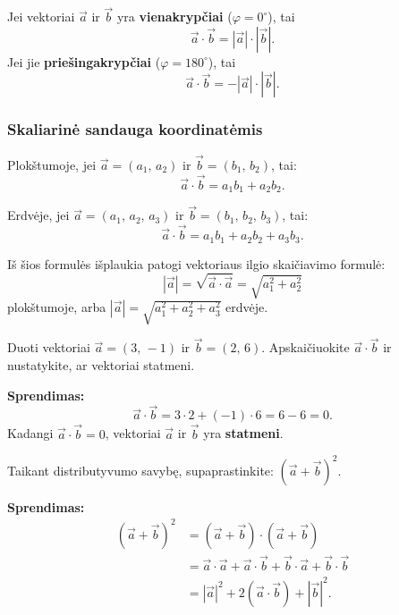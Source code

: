\begin{corollary}[Kolinearumas]
Jei vektoriai $\vec{a}$ ir $\vec{b}$ yra \textbf{vienakrypčiai} ($\varphi = 0^\circ$), tai
\[
\vec{a} \cdot \vec{b} = |\vec{a}| \cdot |\vec{b}|.
\]
Jei jie \textbf{priešingakrypčiai} ($\varphi = 180^\circ$), tai
\[
\vec{a} \cdot \vec{b} = -|\vec{a}| \cdot |\vec{b}|.
\]
\end{corollary}

\subsubsection*{Skaliarinė sandauga koordinatėmis}

Plokštumoje, jei $\vec{a} = (a_1,\, a_2)$ ir $\vec{b} = (b_1,\, b_2)$, tai:
\[
\vec{a} \cdot \vec{b} = a_1 b_1 + a_2 b_2.
\]

Erdvėje, jei $\vec{a} = (a_1,\, a_2,\, a_3)$ ir $\vec{b} = (b_1,\, b_2,\, b_3)$, tai:
\[
\vec{a} \cdot \vec{b} = a_1 b_1 + a_2 b_2 + a_3 b_3.
\]

\begin{remark}
Iš šios formulės išplaukia patogi vektoriaus ilgio skaičiavimo formulė:
\[
|\vec{a}| = \sqrt{\vec{a} \cdot \vec{a}} = \sqrt{a_1^2 + a_2^2}
\]
plokštumoje, arba $|\vec{a}| = \sqrt{a_1^2 + a_2^2 + a_3^2}$ erdvėje.
\end{remark}

\begin{example}
Duoti vektoriai $\vec{a} = (3,\, -1)$ ir $\vec{b} = (2,\, 6)$. Apskaičiuokite $\vec{a} \cdot \vec{b}$ ir nustatykite, ar vektoriai statmeni.

\textbf{Sprendimas:}
\[
\vec{a} \cdot \vec{b} = 3 \cdot 2 + (-1) \cdot 6 = 6 - 6 = 0.
\]
Kadangi $\vec{a} \cdot \vec{b} = 0$, vektoriai $\vec{a}$ ir $\vec{b}$ yra \textbf{statmeni}.
\end{example}

\begin{example}
Taikant distributyvumo savybę, supaprastinkite: $(\vec{a} + \vec{b})^2$.

\textbf{Sprendimas:}
\begin{align*}
(\vec{a} + \vec{b})^2 &= (\vec{a} + \vec{b}) \cdot (\vec{a} + \vec{b}) \\
&= \vec{a} \cdot \vec{a} + \vec{a} \cdot \vec{b} + \vec{b} \cdot \vec{a} + \vec{b} \cdot \vec{b} \\
&= |\vec{a}|^2 + 2(\vec{a} \cdot \vec{b}) + |\vec{b}|^2.
\end{align*}
\end{example}


